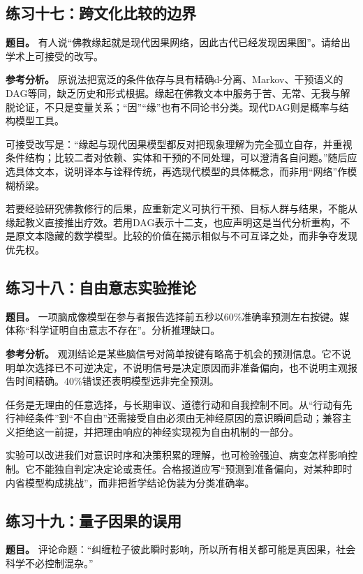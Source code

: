 \subsection*{练习十七：跨文化比较的边界}

\textbf{题目。} 有人说“佛教缘起就是现代因果网络，因此古代已经发现因果图”。请给出学术上可接受的改写。

\textbf{参考分析。} 原说法把宽泛的条件依存与具有精确d-分离、Markov、干预语义的DAG等同，缺乏历史和形式根据。缘起在佛教文本中服务于苦、无常、无我与解脱论证，不只是变量关系；“因”“缘”也有不同论书分类。现代DAG则是概率与结构模型工具。

可接受改写是：“缘起与现代因果模型都反对把现象理解为完全孤立自存，并重视条件结构；比较二者对依赖、实体和干预的不同处理，可以澄清各自问题。”随后应选具体文本，说明译本与诠释传统，再选现代模型的具体概念，而非用“网络”作模糊桥梁。

若要经验研究佛教修行的后果，应重新定义可执行干预、目标人群与结果，不能从缘起教义直接推出疗效。若用DAG表示十二支，也应声明这是当代分析重构，不是原文本隐藏的数学模型。比较的价值在揭示相似与不可互译之处，而非争夺发现优先权。

\subsection*{练习十八：自由意志实验推论}

\textbf{题目。} 一项脑成像模型在参与者报告选择前五秒以60\%准确率预测左右按键。媒体称“科学证明自由意志不存在”。分析推理缺口。

\textbf{参考分析。} 观测结论是某些脑信号对简单按键有略高于机会的预测信息。它不说明单次选择已不可逆决定，不说明信号是决定原因而非准备偏向，也不说明主观报告时间精确。40\%错误还表明模型远非完全预测。

任务是无理由的任意选择，与长期审议、道德行动和自我控制不同。从“行动有先行神经条件”到“不自由”还需接受自由必须由无神经原因的意识瞬间启动；兼容主义拒绝这一前提，并把理由响应的神经实现视为自由机制的一部分。

实验可以改进我们对意识时序和决策积累的理解，也可检验强迫、病变怎样影响控制。它不能独自判定决定论或责任。合格报道应写“预测到准备偏向，对某种即时内省模型构成挑战”，而非把哲学结论伪装为分类准确率。

\subsection*{练习十九：量子因果的误用}

\textbf{题目。} 评论命题：“纠缠粒子彼此瞬时影响，所以所有相关都可能是真因果，社会科学不必控制混杂。”

